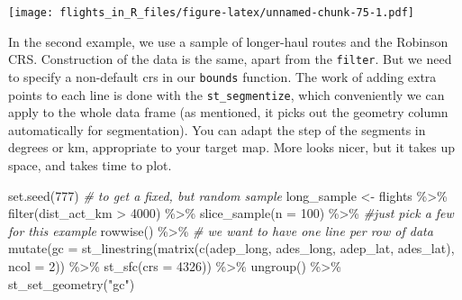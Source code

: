 \documentclass[
]{book}
\newenvironment{Shaded}{\begin{snugshade}}{\end{snugshade}}
\newcommand{\AttributeTok}[1]{\textcolor[rgb]{0.77,0.63,0.00}{#1}}
\newcommand{\CommentTok}[1]{\textcolor[rgb]{0.56,0.35,0.01}{\textit{#1}}}
\newcommand{\DecValTok}[1]{\textcolor[rgb]{0.00,0.00,0.81}{#1}}
\newcommand{\FunctionTok}[1]{\textcolor[rgb]{0.00,0.00,0.00}{#1}}
\newcommand{\NormalTok}[1]{#1}
\newcommand{\OtherTok}[1]{\textcolor[rgb]{0.56,0.35,0.01}{#1}}
\newcommand{\SpecialCharTok}[1]{\textcolor[rgb]{0.00,0.00,0.00}{#1}}
\newcommand{\StringTok}[1]{\textcolor[rgb]{0.31,0.60,0.02}{#1}}
\begin{document}
\texttt{[image: flights\_in\_R\_files/figure-latex/unnamed-chunk-75-1.pdf]}

In the second example, we use a sample of longer-haul routes and the Robinson CRS. Construction of the data is the same, apart from the \texttt{filter}. But we need to specify a non-default crs in our \texttt{bounds} function. The work of adding extra points to each line is done with the \texttt{st\_segmentize}, which conveniently we can apply to the whole data frame (as mentioned, it picks out the geometry column automatically for segmentation). You can adapt the step of the segments in degrees or km, appropriate to your target map. More looks nicer, but it takes up space, and takes time to plot.

\begin{Shaded}
\begin{Highlighting}[]
\FunctionTok{set.seed}\NormalTok{(}\DecValTok{777}\NormalTok{) }\CommentTok{\# to get a fixed, but random sample}
\NormalTok{long\_sample }\OtherTok{\textless{}{-}}\NormalTok{ flights }\SpecialCharTok{\%\textgreater{}\%} 
  \FunctionTok{filter}\NormalTok{(dist\_act\_km }\SpecialCharTok{\textgreater{}} \DecValTok{4000}\NormalTok{) }\SpecialCharTok{\%\textgreater{}\%} 
  \FunctionTok{slice\_sample}\NormalTok{(}\AttributeTok{n =} \DecValTok{100}\NormalTok{) }\SpecialCharTok{\%\textgreater{}\%} \CommentTok{\#just pick a few for this example}
  \FunctionTok{rowwise}\NormalTok{() }\SpecialCharTok{\%\textgreater{}\%} \CommentTok{\# we want to have one line per row of data}
  \FunctionTok{mutate}\NormalTok{(}\AttributeTok{gc =} \FunctionTok{st\_linestring}\NormalTok{(}\FunctionTok{matrix}\NormalTok{(}\FunctionTok{c}\NormalTok{(adep\_long, ades\_long, adep\_lat, ades\_lat),}
                                   \AttributeTok{ncol =} \DecValTok{2}\NormalTok{)) }\SpecialCharTok{\%\textgreater{}\%} 
           \FunctionTok{st\_sfc}\NormalTok{(}\AttributeTok{crs =} \DecValTok{4326}\NormalTok{)) }\SpecialCharTok{\%\textgreater{}\%} 
  \FunctionTok{ungroup}\NormalTok{() }\SpecialCharTok{\%\textgreater{}\%}
  \FunctionTok{st\_set\_geometry}\NormalTok{(}\StringTok{"gc"}\NormalTok{) }


\end{Highlighting}
\end{Shaded}
\end{document}
